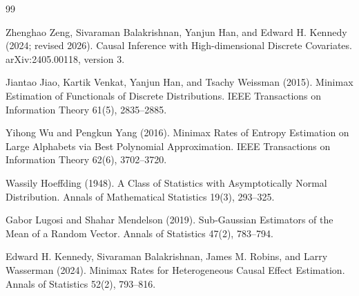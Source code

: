 \documentclass{article}
\begin{document}
\begin{thebibliography}{99}

   Zhenghao Zeng, Sivaraman Balakrishnan, Yanjun Han, and Edward H. Kennedy (2024; revised 2026). Causal Inference with High-dimensional Discrete Covariates. arXiv:2405.00118, version 3.

   Jiantao Jiao, Kartik Venkat, Yanjun Han, and Tsachy Weissman (2015). Minimax Estimation of Functionals of Discrete Distributions. IEEE Transactions on Information Theory 61(5), 2835--2885.

   Yihong Wu and Pengkun Yang (2016). Minimax Rates of Entropy Estimation on Large Alphabets via Best Polynomial Approximation. IEEE Transactions on Information Theory 62(6), 3702--3720.

   Wassily Hoeffding (1948). A Class of Statistics with Asymptotically Normal Distribution. Annals of Mathematical Statistics 19(3), 293--325.

   Gabor Lugosi and Shahar Mendelson (2019). Sub-Gaussian Estimators of the Mean of a Random Vector. Annals of Statistics 47(2), 783--794.

   Edward H. Kennedy, Sivaraman Balakrishnan, James M. Robins, and Larry Wasserman (2024). Minimax Rates for Heterogeneous Causal Effect Estimation. Annals of Statistics 52(2), 793--816.

\end{thebibliography}
\end{document}
